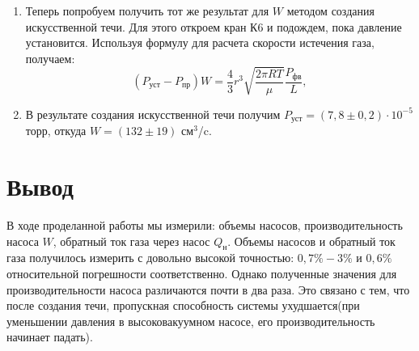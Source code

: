 \documentclass[12pt,a4paper]{article}
\begin{document}
\begin{enumerate}
        \item Теперь попробуем получить тот же результат для $W$ методом 
        создания искусственной течи. Для этого откроем кран К6 и подождем, 
        пока
        давление установится.
        Используя формулу для расчета
        скорости истечения газа, получаем:
        $$ (P_{\text{уст}} - P_{\text{пр}})W = \frac{4}{3}r^3
        \sqrt{\frac{2\pi RT}{\mu}}\frac{P_{\text{фв}}}{L}, $$
        \item В результате создания искусственной течи получим 
        $P_{\text{уст}} = (7{,}8\pm0{,}2)\cdot 10^{-5}$ торр,
        откуда $W = (132 \pm 19)$ см$^3$/c.
    \end{enumerate}
\section{Вывод}
В ходе проделанной работы мы измерили: объемы насосов, производительность насоса $W$, обратный ток газа через насос $Q_{\text{н}}$. Объемы насосов и обратный ток газа получилось измерить с довольно высокой точностью: $0,7\%-3\%$ и $0,6\%$ относительной погрешности соответственно. Однако полученные значения для производительности насоса различаются почти в два раза. Это связано с тем, что после создания течи, пропускная способность системы ухудшается(при уменьшении давления в высоковакуумном насосе, его производительность начинает падать).
\end{document}
